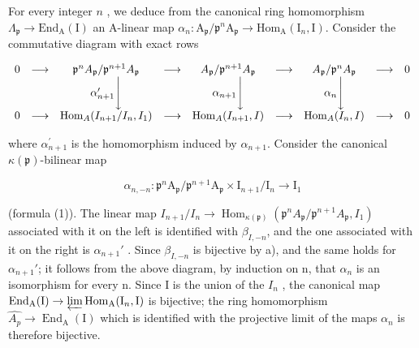 For every integer \(n\) , we deduce from the canonical ring homomorphism \(\Lambda_{\mathfrak{p}} \longrightarrow \mathrm{End}_{\mathrm{A}}(\mathrm{I})\) an A-linear map \(\alpha_{n}: \mathrm{A}_{\mathfrak{p}}/\mathfrak{p}^{n}\mathrm{A}_{\mathfrak{p}} \longrightarrow \mathrm{Hom}_{\mathrm{A}}(\mathrm{I}_{n},\mathrm{I})\). Consider the commutative diagram with exact rows

\[
\begin{array}{c c c c c c c c c} 0 & \longrightarrow & \mathfrak {p} ^ {n} A _ {\mathfrak {p}} / \mathfrak {p} ^ {n + 1} A _ {\mathfrak {p}} & \longrightarrow & A _ {\mathfrak {p}} / \mathfrak {p} ^ {n + 1} A _ {\mathfrak {p}} & \longrightarrow & A _ {\mathfrak {p}} / \mathfrak {p} ^ {n} A _ {\mathfrak {p}} & \longrightarrow & 0 \\ & & \alpha_ {n + 1} ^ {\prime} \Bigg \downarrow & & \alpha_ {n + 1} \Bigg \downarrow & & \alpha_ {n} \Bigg \downarrow \\ 0 & \longrightarrow & \operatorname{Hom} _ {A} (I _ {n + 1} / I _ {n}, I _ {1}) & \longrightarrow & \operatorname{Hom} _ {A} (I _ {n + 1}, I) & \longrightarrow & \operatorname{Hom} _ {A} (I _ {n}, I) & \longrightarrow & 0 \end{array}
\]

where \(\alpha_{n+1}^{\prime}\) is the homomorphism induced by \(\alpha_{n+1}\). Consider the canonical \(\kappa(\mathfrak{p})\)-bilinear map

\[
\alpha_ {n, - n}: \mathfrak {p} ^ {n} \mathrm{A} _ {\mathfrak {p}} / \mathfrak {p} ^ {n + 1} \mathrm{A} _ {\mathfrak {p}} \times \mathrm{I} _ {n + 1} / \mathrm{I} _ {n} \longrightarrow \mathrm{I} _ {1}
\]

(formula (1)). The linear map \(I_{n+1}/I_{n} \longrightarrow \operatorname{Hom}_{\kappa(\mathfrak{p})}(\mathfrak{p}^{n}A_{\mathfrak{p}}/\mathfrak{p}^{n+1}A_{\mathfrak{p}}, I_{1})\) associated with it on the left is identified with \(\beta_{I,-n}\), and the one associated with it on the right is \(\alpha_{n+1}'\) . Since \(\beta_{I,-n}\) is bijective by a), and the same holds for \(\alpha_{n+1}'\); it follows from the above diagram, by induction on n, that \(\alpha_{n}\) is an isomorphism for every n. Since I is the union of the \(I_{n}\) , the canonical map \(\operatorname{End}_{\mathrm{A}}(\mathrm{I}) \to \varprojlim \operatorname{Hom}_{\mathrm{A}}(\mathrm{I}_{n}, \mathrm{I})\) is bijective; the ring homomorphism \(\widehat{A_{p}} \to \operatorname{End}_{\mathrm{A}}(\mathrm{I})\) which is identified with the projective limit of the maps \(\alpha_{n}\) is therefore bijective.

